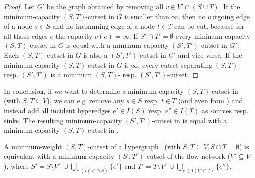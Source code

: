\begin{proof}
Let $G'$ be the graph obtained by removing all $v \in V' \cap (S \cup T)$. If
the minimum-capacity $(S,T)$-cutset in $G$ is smaller than $\infty$, then no outgoing
edge of a node $s \in S$ and no incomming edge of a node $t \in T$ can be cut, because for all
those edges $e$ the capacity $c(e) = \infty$. If $S' \cap T' = \emptyset$ every
minimum-capacity $(S,T)$-cutset in $G$ is equal with a minimum-capacity $(S',T')$-cutset
in $G'$. 
Each $(S,T)$-cutset in $G$ is also a $(S',T')$-cutset in $G'$ and vice versa.
If the minimum-capacity $(S,T)$-cutset in $G$ is $\infty$, every cutset separating
$(S,T)$ resp. $(S',T')$ is a minimum $(S,T)$- resp. $(S',T')$-cutset.
\end{proof}

In conclusion, if we want to determine a minimum-capacity $(S,T)$-cutset
in  (with $S,T \subseteq V$), we can e.g. remove any $s \in S$ resp. $t \in T$ 
(and even from ) and instead add all incident 
hyperedges $e' \in I(S)$ resp. $e'' \in I(T)$ as sources resp. sinks. The resulting 
minimum-capacity $(S',T')$-cutset in  is equal with a minimum-capacity $(S,T)$-cutset
in . 

\begin{theorem}
\label{theorem:st_cutset_equal}
A minimum-weight $(S,T)$-cutset of a hypergraph \HypergraphDef~(with $S,T \subseteq V,
S \cap T = \emptyset$) is equivalent with a minimum-capacity $(S',T')$-cutset of the
flow network  ($V' \subseteq V$), where $S' = S \setminus V'\ \cup \bigcup\limits_{e \in I(V' \cap S)} \{e'\}$ and 
$T' = T \setminus V'\ \cup \bigcup\limits_{e \in I(V'\cap T)} \{e''\}$.
\label{theorem:heuer_network}
\end{theorem}

